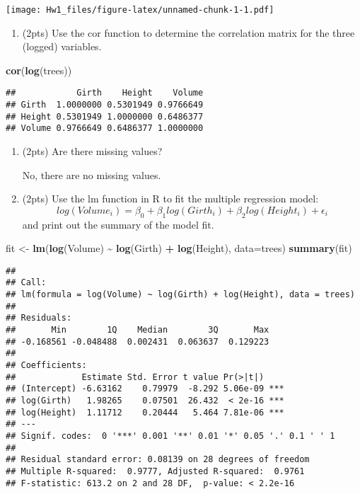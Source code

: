 \documentclass[
]{article}
\newenvironment{Shaded}{\begin{snugshade}}{\end{snugshade}}
\newcommand{\AttributeTok}[1]{\textcolor[rgb]{0.13,0.29,0.53}{#1}}
\newcommand{\FunctionTok}[1]{\textcolor[rgb]{0.13,0.29,0.53}{\textbf{#1}}}
\newcommand{\NormalTok}[1]{#1}
\newcommand{\OtherTok}[1]{\textcolor[rgb]{0.56,0.35,0.01}{#1}}
\newcommand{\SpecialCharTok}[1]{\textcolor[rgb]{0.81,0.36,0.00}{\textbf{#1}}}
\providecommand{\tightlist}{%
  \setlength{\itemsep}{0pt}\setlength{\parskip}{0pt}}
\begin{document}
\texttt{[image: Hw1\_files/figure-latex/unnamed-chunk-1-1.pdf]}

\begin{enumerate}
\def\labelenumi{(\alph{enumi})}
\setcounter{enumi}{2}
\tightlist
\item
  (2pts) Use the cor function to determine the correlation matrix for
  the three (logged) variables.
\end{enumerate}

\begin{Shaded}
\begin{Highlighting}[]
\FunctionTok{cor}\NormalTok{(}\FunctionTok{log}\NormalTok{(trees))}
\end{Highlighting}
\end{Shaded}

\begin{verbatim}
##            Girth    Height    Volume
## Girth  1.0000000 0.5301949 0.9766649
## Height 0.5301949 1.0000000 0.6486377
## Volume 0.9766649 0.6486377 1.0000000
\end{verbatim}

\begin{enumerate}
\def\labelenumi{(\alph{enumi})}
\setcounter{enumi}{3}
\item
  (2pts) Are there missing values?

  No, there are no missing values.
\item
  (2pts) Use the lm function in R to fit the multiple regression model:
  \[log(Volume_i) = \beta_0 + \beta_1 log(Girth_i) + \beta_2 log(Height_i) + \epsilon_i\]
  and print out the summary of the model fit.
\end{enumerate}

\begin{Shaded}
\begin{Highlighting}[]
\NormalTok{fit }\OtherTok{\textless{}{-}} \FunctionTok{lm}\NormalTok{(}\FunctionTok{log}\NormalTok{(Volume) }\SpecialCharTok{\textasciitilde{}} \FunctionTok{log}\NormalTok{(Girth) }\SpecialCharTok{+} \FunctionTok{log}\NormalTok{(Height), }\AttributeTok{data=}\NormalTok{trees)}
\FunctionTok{summary}\NormalTok{(fit)}
\end{Highlighting}
\end{Shaded}

\begin{verbatim}
## 
## Call:
## lm(formula = log(Volume) ~ log(Girth) + log(Height), data = trees)
## 
## Residuals:
##       Min        1Q    Median        3Q       Max 
## -0.168561 -0.048488  0.002431  0.063637  0.129223 
## 
## Coefficients:
##             Estimate Std. Error t value Pr(>|t|)    
## (Intercept) -6.63162    0.79979  -8.292 5.06e-09 ***
## log(Girth)   1.98265    0.07501  26.432  < 2e-16 ***
## log(Height)  1.11712    0.20444   5.464 7.81e-06 ***
## ---
## Signif. codes:  0 '***' 0.001 '**' 0.01 '*' 0.05 '.' 0.1 ' ' 1
## 
## Residual standard error: 0.08139 on 28 degrees of freedom
## Multiple R-squared:  0.9777, Adjusted R-squared:  0.9761 
## F-statistic: 613.2 on 2 and 28 DF,  p-value: < 2.2e-16
\end{verbatim}
\end{document}
